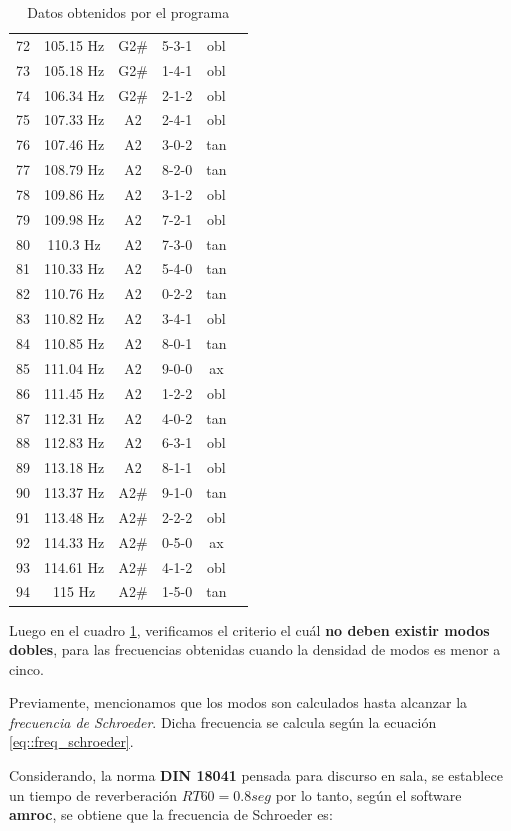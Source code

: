 \begin{table}[]
\begin{tabular}{c|c|c|c|c|c}
72&105.15 Hz&G2\#&5-3-1&obl\\
73&105.18 Hz&G2\#&1-4-1&obl\\
74&106.34 Hz&G2\#&2-1-2&obl\\
75&107.33 Hz&A2&2-4-1&obl\\
76&107.46 Hz&A2&3-0-2&tan\\
77&108.79 Hz&A2&8-2-0&tan\\
78&109.86 Hz&A2&3-1-2&obl\\
79&109.98 Hz&A2&7-2-1&obl\\
80&110.3 Hz&A2&7-3-0&tan\\
81&110.33 Hz&A2&5-4-0&tan\\
82&110.76 Hz&A2&0-2-2&tan\\
83&110.82 Hz&A2&3-4-1&obl\\
84&110.85 Hz&A2&8-0-1&tan\\
85&111.04 Hz&A2&9-0-0&ax\\
86&111.45 Hz&A2&1-2-2&obl\\
87&112.31 Hz&A2&4-0-2&tan\\
88&112.83 Hz&A2&6-3-1&obl\\
89&113.18 Hz&A2&8-1-1&obl\\
90&113.37 Hz&A2\#&9-1-0&tan\\
91&113.48 Hz&A2\#&2-2-2&obl\\
92&114.33 Hz&A2\#&0-5-0&ax\\
93&114.61 Hz&A2\#&4-1-2&obl\\
94&115 Hz&A2\#&1-5-0&tan\\
    \end{tabular}
    \caption{Datos obtenidos por el programa}
    \label{tab:datos_obtenidos_programa}
\end{table}


\newpage

\par Luego en el cuadro \ref{tab:datos_obtenidos_programa}, verificamos el criterio el cuál \textbf{no deben existir modos dobles}, para las frecuencias obtenidas cuando la densidad de modos es menor a cinco.\\


\par Previamente, mencionamos que los modos son calculados hasta alcanzar la \textit{frecuencia de Schroeder}. Dicha frecuencia se calcula según la ecuación \eqref{eq::freq_schroeder}.

\par Considerando, la norma \textbf{DIN 18041} pensada para discurso en sala, se establece un tiempo de reverberación $RT60 = 0.8seg$ por lo tanto, según el software \textbf{amroc}, se obtiene que la frecuencia de Schroeder es:


